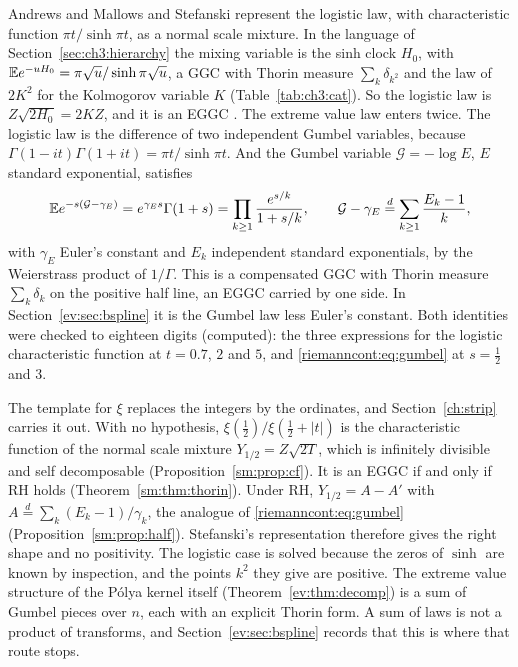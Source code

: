 Andrews and Mallows \cite{AndrewsMallows74} and Stefanski \cite{Stefanski91} represent the logistic law, with characteristic function $\pi t/\sinh\pi t$, as a normal scale mixture. In the language of Section~\ref{sec:ch3:hierarchy} the mixing variable is the sinh clock $H_0$, with $\mathbb{E} e^{-uH_0}=\pi\sqrt u/\sinh\pi\sqrt u$, a GGC with Thorin measure $\sum_k\delta_{k^2}$ and the law of $2K^2$ for the Kolmogorov variable $K$ (Table~\ref{tab:ch3:cat}). So the logistic law is $Z\sqrt{2H_0}=2KZ$, and it is an EGGC \cite[Theorem 7.3.1]{Bondesson}. The extreme value law enters twice. The logistic law is the difference of two independent Gumbel variables, because $\Gamma(1-it)\Gamma(1+it)=\pi t/\sinh\pi t$. And the Gumbel variable $\mathcal G=-\log E$, $E$ standard exponential, satisfies
\begin{equation}\label{riemanncont:eq:gumbel}
\mathbb{E} e^{-s(\mathcal G-\gamma_E)}=e^{\gamma_Es}\Gamma(1+s)=\prod_{k\ge1}\frac{e^{s/k}}{1+s/k},\qquad \mathcal G-\gamma_E\overset d=\sum_{k\ge1}\frac{E_k-1}k,
\end{equation}
with $\gamma_E$ Euler's constant and $E_k$ independent standard exponentials, by the Weierstrass product of $1/\Gamma$. This is a compensated GGC with Thorin measure $\sum_k\delta_k$ on the positive half line, an EGGC carried by one side. In Section~\ref{ev:sec:bspline} it is the Gumbel law less Euler's constant. Both identities were checked to eighteen digits (computed): the three expressions for the logistic characteristic function at $t=0.7$, $2$ and $5$, and \eqref{riemanncont:eq:gumbel} at $s=\frac12$ and $3$.

The template for $\xi$ replaces the integers by the ordinates, and Section~\ref{ch:strip} carries it out. With no hypothesis, $\xi(\frac12)/\xi(\frac12+|t|)$ is the characteristic function of the normal scale mixture $Y_{1/2}=Z\sqrt{2T}$, which is infinitely divisible and self decomposable (Proposition~\ref{sm:prop:cf}). It is an EGGC if and only if RH holds (Theorem~\ref{sm:thm:thorin}). Under RH, $Y_{1/2}=A-A'$ with $A\overset d=\sum_k(E_k-1)/\gamma_k$, the analogue of \eqref{riemanncont:eq:gumbel} (Proposition~\ref{sm:prop:half}). Stefanski's representation therefore gives the right shape and no positivity. The logistic case is solved because the zeros of $\sinh$ are known by inspection, and the points $k^2$ they give are positive. The extreme value structure of the P\'olya kernel itself (Theorem~\ref{ev:thm:decomp}) is a sum of Gumbel pieces over $n$, each with an explicit Thorin form. A sum of laws is not a product of transforms, and Section~\ref{ev:sec:bspline} records that this is where that route stops.


